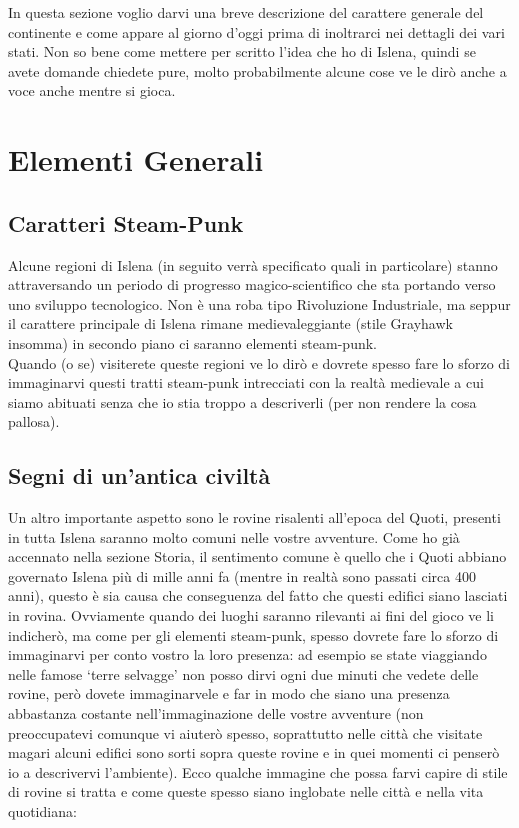 \documentclass[a4paper]{report}
\begin{document}
\begin{multicols}{2}
In questa sezione voglio darvi una breve descrizione del carattere generale del continente e come appare al giorno d’oggi prima di inoltrarci nei dettagli dei vari stati. Non so bene come mettere per scritto l’idea che ho di Islena, quindi se avete domande chiedete pure, molto probabilmente alcune cose ve le dirò anche a voce anche mentre si gioca.

\section{Elementi Generali}
\subsection*{Caratteri Steam-Punk}
Alcune regioni di Islena (in seguito verrà specificato quali in particolare) stanno attraversando un periodo di progresso magico-scientifico che sta portando verso uno sviluppo tecnologico. Non è una roba tipo Rivoluzione Industriale, ma seppur il carattere principale di Islena rimane medievaleggiante (stile Grayhawk insomma) in secondo piano ci saranno elementi steam-punk.\\
Quando (o se) visiterete queste regioni ve lo dirò e dovrete spesso fare lo sforzo di immaginarvi questi tratti steam-punk intrecciati con la realtà medievale a cui siamo abituati senza che io stia troppo a descriverli (per non rendere la cosa pallosa).

\subsection*{Segni di un'antica civiltà}
Un altro importante aspetto sono le rovine risalenti all’epoca del Quoti, presenti in tutta Islena saranno molto comuni nelle vostre avventure. Come ho già accennato nella sezione Storia, il sentimento comune è quello che i Quoti abbiano governato Islena più di mille anni fa (mentre in realtà sono passati circa 400 anni), questo è sia causa che conseguenza del fatto che questi edifici siano lasciati in rovina. Ovviamente quando dei luoghi saranno rilevanti ai fini del gioco ve li indicherò, ma come per gli elementi steam-punk, spesso dovrete fare lo sforzo di immaginarvi per conto vostro la loro presenza: ad esempio se state viaggiando nelle famose \enquote*{terre selvagge} non posso dirvi ogni due minuti che vedete delle rovine, però dovete immaginarvele e far in modo che siano una presenza abbastanza costante nell’immaginazione delle vostre avventure (non preoccupatevi comunque vi aiuterò spesso, soprattutto nelle città che visitate magari alcuni edifici sono sorti sopra queste rovine e in quei momenti ci penserò io a descrivervi l’ambiente). Ecco qualche immagine che possa farvi capire di stile di rovine si tratta e come queste spesso siano inglobate nelle città e nella vita quotidiana:\\


\end{multicols}
\end{document}
